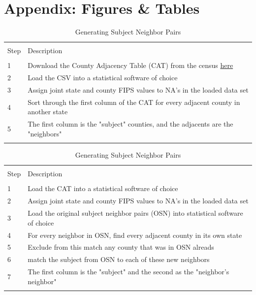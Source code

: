 \documentclass[12pt,a4paper]{article}
\begin{document}
\section{Appendix: Figures \& Tables}

\begin{table}[!htbp] \centering 
  \caption{Generating Subject Neighbor Pairs} 
  \label{gensubnbr} 
\begin{tabular}{@{\extracolsep{5pt}}ll} 
\\[-1.8ex]\hline 
\hline \\[-1.8ex] 
Step & Description\\ 
\hline \\[-1.8ex] 
1 & Download the County Adjacency Table (CAT) from the census \href{https://www.census.gov/geo/reference/county-adjacency.html}{here} \\
2 & Load the CSV into a statistical software of choice \\
3 & Assign joint state and county FIPS values to NA's in the loaded data set \\
4 & Sort through the first column of the CAT for every adjacent county in another state \\
5 & The first column is the "subject" counties, and the adjacents are the "neighbors" \\
\hline \\[-1.8ex]
\end{tabular} 
\end{table} 

\begin{table}[!htbp] \centering 
  \caption{Generating Subject Neighbor Pairs} 
  \label{genextrd} 
\begin{tabular}{@{\extracolsep{5pt}}ll} 
\\[-1.8ex]\hline 
\hline \\[-1.8ex] 
Step & Description\\ 
\hline \\[-1.8ex] 
1 & Load the CAT into a statistical software of choice \\
2 & Assign joint state and county FIPS values to NA's in the loaded data set \\
3 & Load the original subject neighbor pairs (OSN) into statistical software of choice \\
4 & For every neighbor in OSN, find every adjacent county in its own state \\
5 & Exclude from this match any county that was in OSN alreads \\
6 & match the subject from OSN to each of these new neighbors \\ 
7 & The first column is the "subject" and the second as the "neighbor's neighbor" \\
\hline \\[-1.8ex]
\end{tabular} 
\end{table} 
\end{document}
